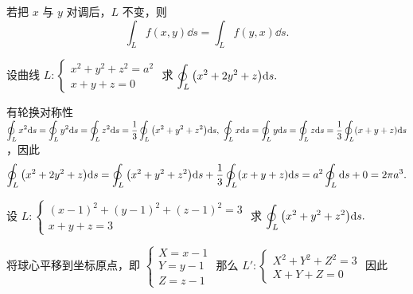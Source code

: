 \begin{theorem}[轮换对称性]
    若把 $x$ 与 $y$ 对调后，$L$ 不变，则 $$\int_L f(x,y)\dd s=\int_Lf(y,x)\dd s.$$
\end{theorem}

\begin{example}
    设曲线 $L:\begin{cases}
            x^2+y^2+z^2=a^2 \\
            x+y+z=0
        \end{cases}$ 求 $\displaystyle\oint_L\qty(x^2+2y^2+z)\dd s.$
\end{example}
\begin{solution}
    有轮换对称性 $\displaystyle\oint_Lx^2\dd s=\oint_Ly^2\dd s=\oint_Lz^2\dd s=\dfrac{1}{3}\oint_L\qty(x^2+y^2+z^2)\dd s,~\oint_Lx\dd s=\oint_Ly\dd s=\oint_Lz\dd s=\dfrac{1}{3}\oint_L(x+y+z)\dd s$，因此
    $$\oint_L\qty(x^2+2y^2+z)\dd s=\oint_L\qty(x^2+y^2+z^2)\dd s+\dfrac{1}{3}\oint_L(x+y+z)\dd s=a^2\oint_L\dd s+0=2\pi a^3.$$
\end{solution}

\begin{example}
    设 $L:\begin{cases}
            (x-1)^2+(y-1)^2+(z-1)^2=3 \\
            x+y+z=3
        \end{cases}$ 求 $\displaystyle\oint_L\qty(x^2+y^2+z^2)\dd s.$
\end{example}
\begin{solution}
    将球心平移到坐标原点，即 $\begin{cases}
            X=x-1 \\
            Y=y-1 \\
            Z=z-1
        \end{cases}$ 那么 $L':\begin{cases}
            X^2+Y^2+Z^2=3 \\
            X+Y+Z=0
        \end{cases}$ 因此
\end{solution}

